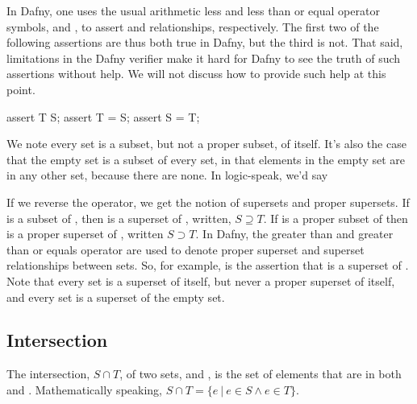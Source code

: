 \documentclass[letterpaper,10pt,english]{sphinxmanual}
\begin{document}
In Dafny, one uses the usual arithmetic less and less than or
equal operator symbols, \sphinxstyleemphasis{\textless{}} and \sphinxstyleemphasis{\textless{}=}, to assert  and
 relationships, respectively. The first two of the following
assertions are thus both true in Dafny, but the third is not. That
said, limitations in the Dafny verifier make it hard for Dafny to see
the truth of such assertions without help. We will not discuss how to
provide such help at this point.

\begin{sphinxVerbatim}[commandchars=\\\{\}]
assert T \PYGZlt{} S;
assert T \PYGZlt{}= S;
assert S \PYGZlt{}= T;
\end{sphinxVerbatim}

We note every set is a subset, but not a proper subset, of
itself. It’s also the case that the empty set is a subset of every
set, in that  elements in the empty set are in any other set,
because there are none. In logic-speak, we’d say 

If we reverse the operator, we get the notion of supersets and proper
supersets. If  is a subset of , then  is a superset of ,
written, \(S \supseteq T\). If  is a proper subset of  then
 is a proper superset of , written \(S \supset T\). In
Dafny, the greater than and greater than or equals operator are used
to denote proper superset and superset relationships between sets.
So, for example,  is the assertion that  is a superset of
. Note that every set is a superset of itself, but never a proper
superset of itself, and every set is a superset of the empty set.


\subsection{Intersection}
\label{\detokenize{07-set-theory:intersection}}
The intersection, \(S \cap T\), of two sets,  and , is the
set of elements that are in both  and . Mathematically speaking,
\(S \cap T = \{ e~|~e \in S \land e \in T \}\).
\end{document}
